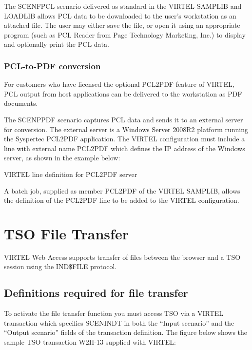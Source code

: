 \documentclass[letterpaper,10pt,english]{sphinxmanual}
\begin{document}
The SCENFPCL scenario delivered as standard in the VIRTEL SAMPLIB and LOADLIB allows PCL data to be downloaded
to the user’s workstation as an attached file. The user may either save the file, or open it using an appropriate program
(such as PCL Reader from Page Technology Marketing, Inc.) to display and optionally print the PCL data.


\subsubsection{PCL-to-PDF conversion}
\label{\detokenize{User_Guide:pcl-to-pdf-conversion}}
For customers who have licensed the optional PCL2PDF feature of VIRTEL, PCL output from host applications can be
delivered to the workstation as PDF documents.

The SCENPPDF scenario captures PCL data and sends it to an external server for conversion. The external server is a
Windows Server 2008R2 platform running the Syspertec PCL2PDF application. The VIRTEL configuration must include a
line with external name PCL2PDF which defines the IP address of the Windows server, as shown in the example below:

VIRTEL line definition for PCL2PDF server

A batch job, supplied as member PCL2PDF of the VIRTEL SAMPLIB, allows the definition of the PCL2PDF line to be
added to the VIRTEL configuration.


\section{TSO File Transfer}
\label{\detokenize{User_Guide:tso-file-transfer}}
VIRTEL Web Access supports transfer of files between the browser and a TSO session using the IND\$FILE protocol.


\subsection{Definitions required for file transfer}
\label{\detokenize{User_Guide:definitions-required-for-file-transfer}}
To activate the file transfer function you must access TSO via a VIRTEL transaction which specifies SCENINDT in both
the “Input scenario” and the “Output scenario” fields of the transaction definition. The figure below shows the sample
TSO transaction W2H-13 supplied with VIRTEL:

 
\end{document}
